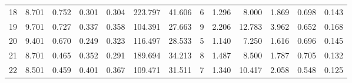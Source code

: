 \begin{tabular}{rrrrrrrrrrrrr}
18 & 8.701 & 0.752 & 0.301 & 0.304 & 223.797 & 41.606 & 6 & 1.296 & 8.000 & 1.869 & 0.698 & 0.143 \\
19 & 9.701 & 0.727 & 0.337 & 0.358 & 104.391 & 27.663 & 9 & 2.206 & 12.783 & 3.962 & 0.652 & 0.168 \\
20 & 9.401 & 0.670 & 0.249 & 0.323 & 116.497 & 28.533 & 5 & 1.140 & 7.250 & 1.616 & 0.696 & 0.145 \\
21 & 8.701 & 0.465 & 0.352 & 0.291 & 189.694 & 34.213 & 8 & 1.487 & 8.500 & 1.787 & 0.705 & 0.132 \\
22 & 8.501 & 0.459 & 0.401 & 0.367 & 109.471 & 31.511 & 7 & 1.340 & 10.417 & 2.058 & 0.548 & 0.125 \\
\end{tabular}
